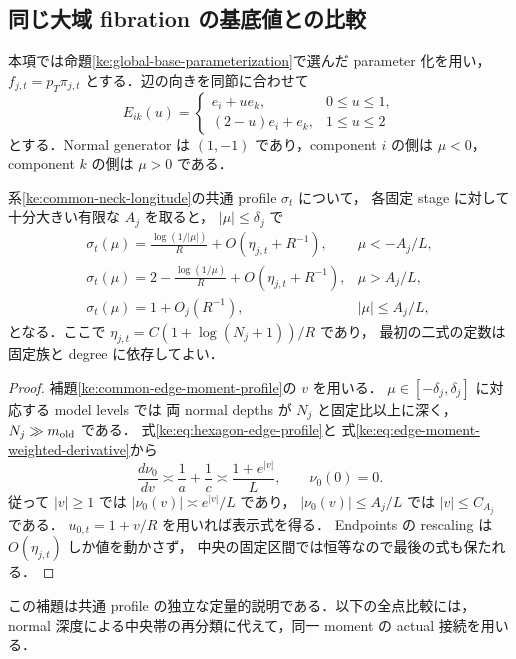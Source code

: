 \subsection{同じ大域 fibration の基底値との比較}

本項では命題\ref{ke:global-base-parameterization}で選んだ parameter 化を用い，
$f_{j,t}=p_T\pi_{j,t}$ とする．辺の向きを同節に合わせて
\[
 E_{ik}(u)=
 \begin{cases}e_i+u e_k,&0\le u\le1,\\
 (2-u)e_i+e_k,&1\le u\le2
 \end{cases}
\]
とする．Normal generator は $(1,-1)$ であり，component $i$ の側は
$\mu<0$，component $k$ の側は $\mu>0$ である．

\begin{lemma}
\label{ke:common-profile-log-depth}
系\ref{ke:common-neck-longitude}の共通 profile $\sigma_t$ について，
各固定 stage に対して十分大きい有限な $A_j$ を取ると，
$|\mu|\le\delta_j$ で
\[
\begin{array}{ll}
 \displaystyle
 \sigma_t(\mu)=\frac{\log(1/|\mu|)}R
       +O(\eta_{j,t}+R^{-1}),
       & \mu<-A_j/L,\\[4pt]
 \displaystyle
 \sigma_t(\mu)=2-\frac{\log(1/\mu)}R
       +O(\eta_{j,t}+R^{-1}),
       & \mu>A_j/L,\\[4pt]
 \displaystyle
 \sigma_t(\mu)=1+O_j(R^{-1}),
       &|\mu|\le A_j/L,
\end{array}
\]
となる．ここで $\eta_{j,t}=C(1+\log(N_j+1))/R$ であり，
最初の二式の定数は固定族と degree に依存してよい．
\end{lemma}

\begin{proof}
補題\ref{ke:common-edge-moment-profile}の $v$ を用いる．
$\mu\in[-\delta_j,\delta_j]$ に対応する model levels では
両 normal depths が $N_j$ と固定比以上に深く，
$N_j\gg m_{\rm old}$ である．
式\eqref{ke:eq:hexagon-edge-profile}と
式\eqref{ke:eq:edge-moment-weighted-derivative}から
\[
 \frac{d\nu_0}{dv}\asymp
 \frac1a+\frac1c\asymp\frac{1+e^{|v|}}L,
 \qquad \nu_0(0)=0.
\]
従って $|v|\ge1$ では $|\nu_0(v)|\asymp e^{|v|}/L$ であり，
$|\nu_0(v)|\le A_j/L$ では $|v|\le C_{A_j}$ である．
$u_{0,t}=1+v/R$ を用いれば表示式を得る．
Endpoints の rescaling は $O(\eta_{j,t})$ しか値を動かさず，
中央の固定区間では恒等なので最後の式も保たれる．
\end{proof}

この補題は共通 profile の独立な定量的説明である．以下の全点比較には，
normal 深度による中央帯の再分類に代えて，同一 moment の actual 接続を用いる．

